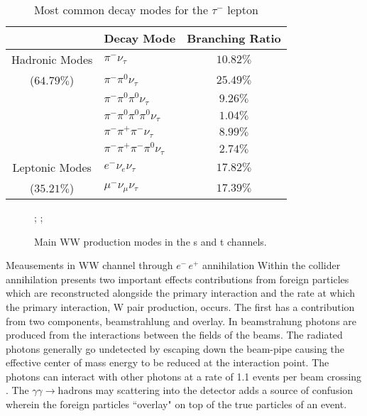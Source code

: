 \begin{table}
\centering
 \begin{tabular}{|c|l|c|} 
 
 \hline
       & Decay Mode & Branching Ratio  \\ \hline \hline
    Hadronic Modes  & $\pi^- \nu_\tau$  & $10.82\%$  \\
      	($64.79\%$) & $\pi^- \pi^0 \nu_\tau$ & $25.49\%$ \\
     				& $\pi^- \pi^0 \pi^0 \nu_\tau$  & $9.26\%$  \\
     				& $\pi^- \pi^0 \pi^0 \pi^0 \nu_\tau$  & $1.04\%$   \\
      				& $\pi^- \pi^+ \pi^- \nu_\tau$  & $8.99\%$      \\ 
      				& $\pi^- \pi^+ \pi^- \pi^0 \nu_\tau$  & $2.74\%$  \\ \hline
    			    
    Leptonic Modes  & $e^- \nu_e \nu_\tau$ & $17.82\%$   \\
    	($35.21\%$)	& $\mu^- \nu_\mu \nu_\tau $  & $17.39\%$      \\ \midrule \hline
      				
     				
\end{tabular}
        \caption{\label{tab:taudecay}Most common decay modes for the $\tau^-$ lepton \cite{pdg}}
\end{table}
       
  
   




\begin{figure}
\centering
{};
    ;
\caption{\label{fig:wwdiag} Main WW production modes in the s and t channels. }
\end{figure}

  
  Meausements in WW channel through  $e^- \, e^+$ annihilation Within the collider annihilation presents two important effects contributions from foreign particles which are reconstructed alongside the primary interaction and the rate at which the primary interaction, W pair production, occurs. The first has a contribution from two components, beamstrahlung and overlay. In beamstrahung photons are produced from the interactions between the fields of the beams. The radiated photons generally go undetected by escaping down the beam-pipe causing the effective center of mass energy to be reduced at the interaction point. The photons can interact with other photons at a rate of 1.1 events per beam crossing \cite{ILDTDR}. The $\gamma \gamma \rightarrow \text{hadrons}$ may scattering into the detector adds a source of confusion wherein the foreign particles ``overlay" on top of the true particles of an event.

